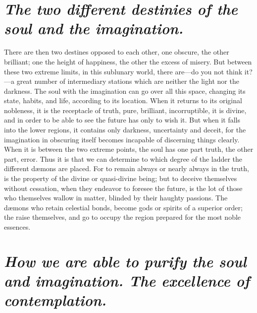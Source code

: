 \documentclass[12pt]{article}
\begin{document}
\section{\mdseries\itshape The two different destinies of the soul and the
imagination.}

There are then two destines opposed to each other, one obscure, the other
brilliant; one the height of happiness, the other the excess of misery. But
between these two extreme limits, in this sublunary world, there are---do you
not think it?---a great number of intermediary stations which are neither the
light nor the darkness. The soul with the imagination can go over all this
space, changing its state, habits, and life, according to its location. When it
returns to its original nobleness, it is the receptacle of truth, pure,
brilliant, incorruptible, it is divine, and in order to be able to see the
future has only to wish it. But when it falls into the lower regions, it
contains only darkness, uncertainty and deceit, for the imagination in
obscuring itself becomes incapable of discerning things clearly. When it is
between the two extreme points, the soul has one part truth, the other part,
error. Thus it is that we can determine to which degree of the ladder the
different d{\ae}mons are placed. For to remain always or nearly always in the
truth, is the property of the divine or quasi-divine being; but to deceive
themselves without cessation, when they endeavor to foresee the future, is the
lot of those who themselves wallow in matter, blinded by their haughty
passions. The d{\ae}mons who retain celestial bonds, become gods or spirits of
a superior order; the raise themselves, and go to occupy the region prepared
for the most noble essences.


\section{\mdseries\itshape How we are able to purify the soul and imagination.
The excellence of contemplation.}
\end{document}
